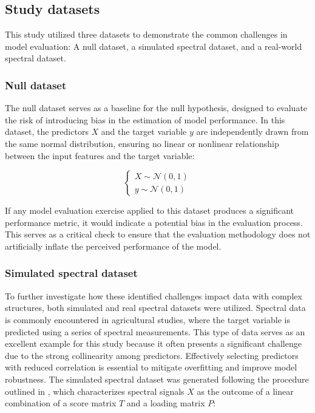 \subsection{Study datasets}

This study utilized three datasets to demonstrate the common challenges in model evaluation: A null dataset, a simulated spectral dataset, and a real-world spectral dataset. 

\subsubsection{Null dataset}

The null dataset serves as a baseline for the null hypothesis, designed to evaluate the risk of introducing bias in the estimation of model performance. In this dataset, the predictors $X$ and the target variable $y$ are independently drawn from the same normal distribution, ensuring no linear or nonlinear relationship between the input features and the target variable:

\begin{equation} \label{eq_null}
    \begin{cases}
    X \sim \mathcal{N}(0, 1) \\
    y \sim \mathcal{N}(0, 1)
    \end{cases}
\end{equation}

If any model evaluation exercise applied to this dataset produces a significant performance metric, it would indicate a potential bias in the evaluation process. This serves as a critical check to ensure that the evaluation methodology does not artificially inflate the perceived performance of the model.

\subsubsection{Simulated spectral dataset}

To further investigate how these identified challenges impact data with complex structures, both simulated and real spectral datasets were utilized. Spectral data is commonly encountered in agricultural studies, where the target variable is predicted using a series of spectral measurements. This type of data serves as an excellent example for this study because it often presents a significant challenge due to the strong collinearity among predictors. Effectively selecting predictors with reduced correlation is essential to mitigate overfitting and improve model robustness. The simulated spectral dataset was generated following the procedure outlined in \citep{metz_note_2020}, which characterizes spectral signals $X$ as the outcome of a linear combination of a score matrix $T$ and a loading matrix $P$:

